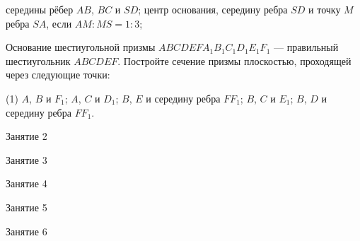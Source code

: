 \begin{class}[number=1]
\begin{listofex}
\begin{tasks}
			\task середины рёбер \( AB \), \( BC \) и \( SD \);
			\task центр основания, середину ребра \( SD \) и точку \( M \) ребра \( SA \),
			если \( AM : MS = 1 : 3 \);
		\end{tasks}
		\newpage
		\item Основание шестиугольной призмы \( ABCDEFA_1B_1C_1D_1E_1F_1 \) ---
		правильный шестиугольник \( ABCDEF \).
		Постройте сечение призмы плоскостью,
		проходящей через следующие точки:
		\begin{tasks}(1)
			\task \( A \), \( B \) и \( F_1 \);
			\task \( A \), \( C \) и \( D_1 \);
			\task \( B \), \( E \) и середину ребра \( FF_1 \);
			\task \( B \), \( C \) и \( E_1 \);
			\task \( B \), \( D \) и середину ребра \( FF_1 \).
	\end{tasks}
	\end{listofex}
\end{class}

\begin{class}[number=2]
	\begin{listofex}
		\item Занятие 2
	\end{listofex}
\end{class}

\begin{class}[number=3]
	\begin{listofex}
		\item Занятие 3
	\end{listofex}
\end{class}

\begin{class}[number=4]
	\begin{listofex}
		\item Занятие 4
	\end{listofex}
\end{class}

\begin{class}[number=5]
	\begin{listofex}
		\item Занятие 5
	\end{listofex}
\end{class}

\begin{class}[number=6]
	\begin{listofex}
		\item Занятие 6
	\end{listofex}
\end{class}

